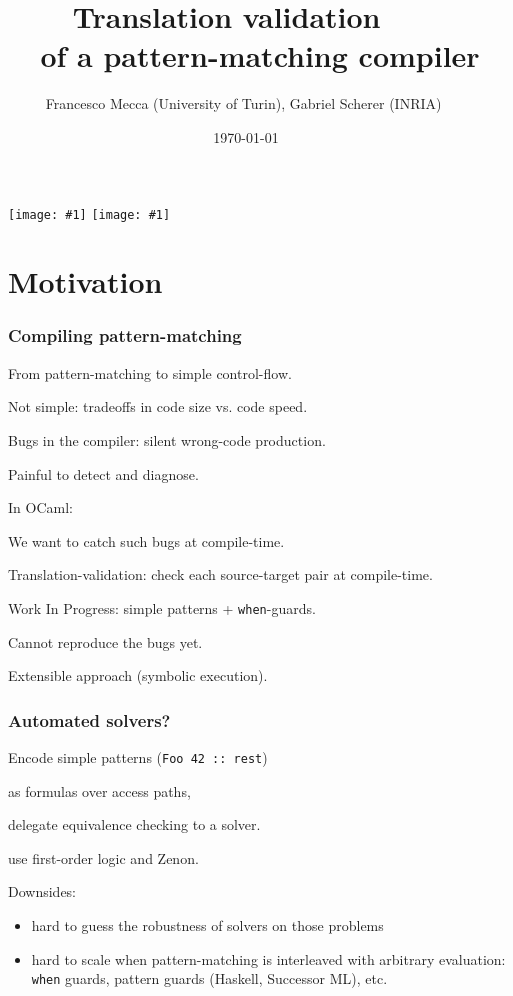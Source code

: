 \documentclass[dvipsnames]{beamer}
\title{Translation validation $\qquad$ \\ of a pattern-matching compiler $\qquad$}
\subtitle{}
\author{Francesco Mecca (University of Turin), Gabriel Scherer (INRIA) $\qquad$}
\date{\today$\qquad$}
\begin{document}

\newcommand{\showface}[1]{\texttt{[image: \#1]}}
\begin{frame}
  \titlepage

\begin{center}
  \showface{pictures/Francesco_Mecca.jpg}
  \showface{pictures/Gabriel_Scherer.jpg}
  $\qquad$
\end{center}
\end{frame}

\section{Motivation}

\begin{frame}
  \frametitle{Compiling pattern-matching}

  From pattern-matching to simple control-flow.

  Not simple: tradeoffs in code size vs. code speed.

  \vfill

  Bugs in the compiler: silent wrong-code production.

  Painful to detect and diagnose.

  \vfill

  In OCaml: %

  \vfill

  We want to catch such bugs at compile-time.

  Translation-validation: check each source-target pair at compile-time.

  \vfill

  Work In Progress: simple patterns + \texttt{when}-guards.

  Cannot reproduce the bugs yet.

  Extensible approach (symbolic execution).
\end{frame}

\begin{frame}
  \frametitle{Automated solvers?}

  Encode simple patterns (\lstinline{Foo 42 :: rest})

  as formulas over access paths,

  delegate equivalence checking to a solver.

  \vfill

  \citet*{tom} use first-order logic and Zenon.

  \vfill

  Downsides:
  \begin{itemize}
  \item hard to guess the robustness of solvers on those problems
  \item hard to scale when pattern-matching is interleaved with arbitrary evaluation:
    \texttt{when} guards, pattern guards (Haskell, Successor ML), etc.
  \end{itemize}

  \vfill\vfill

  
\end{frame}
\end{document}
